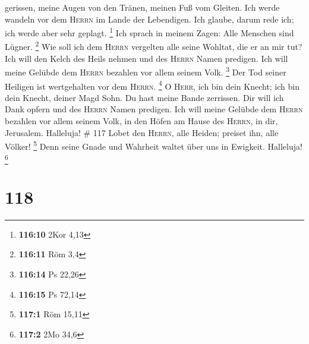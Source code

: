 gerissen, meine Augen von den Tränen, meinen Fuß vom Gleiten.
 Ich werde wandeln vor dem \textsc{Herrn} im Lande der
Lebendigen.  Ich glaube, darum rede ich; ich werde aber
sehr geplagt. \footnote{\textbf{116:10} 2Kor 4,13}  Ich
sprach in meinem Zagen: Alle Menschen sind Lügner. \footnote{\textbf{116:11}
  Röm 3,4}  Wie soll ich dem \textsc{Herrn} vergelten
alle seine Wohltat, die er an mir tut?  Ich will den
Kelch des Heils nehmen und des \textsc{Herrn} Namen predigen.
 Ich will meine Gelübde dem \textsc{Herrn} bezahlen vor
allem seinem Volk. \footnote{\textbf{116:14} Ps 22,26} 
Der Tod seiner Heiligen ist wertgehalten vor dem \textsc{Herrn}.
\footnote{\textbf{116:15} Ps 72,14}  O \textsc{Herr}, ich
bin dein Knecht; ich bin dein Knecht, deiner Magd Sohn. Du hast meine
Bande zerrissen.  Dir will ich Dank opfern und des
\textsc{Herrn} Namen predigen.  Ich will meine Gelübde
dem \textsc{Herrn} bezahlen vor allem seinem Volk,  in
den Höfen am Hause des \textsc{Herrn}, in dir, Jerusalem. Halleluja! \#
117  Lobet den \textsc{Herrn}, alle Heiden; preiset ihn,
alle Völker! \footnote{\textbf{117:1} Röm 15,11}  Denn
seine Gnade und Wahrheit waltet über uns in Ewigkeit. Halleluja!
\footnote{\textbf{117:2} 2Mo 34,6}

\hypertarget{section-38}{%
\section{118}\label{section-38}}


